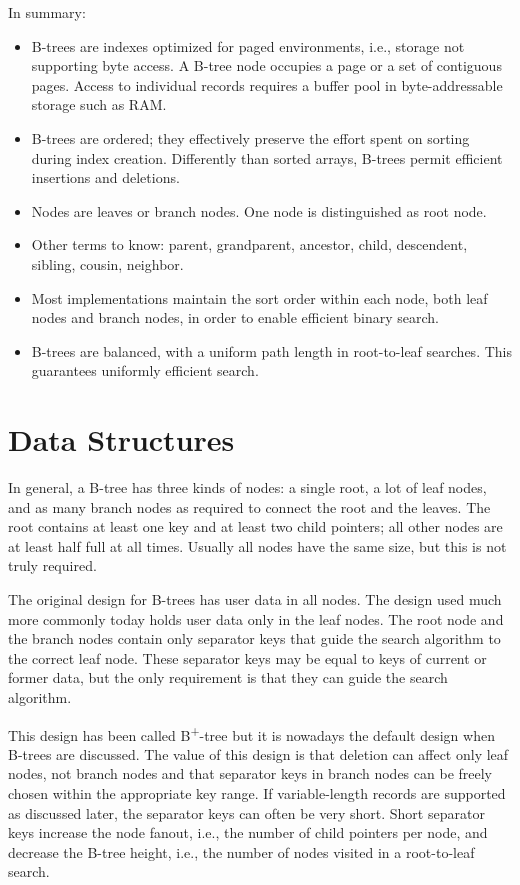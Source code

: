 In summary:

\begin{itemize}
\item
  B-trees are indexes optimized for paged environments, i.e., storage
  not supporting byte access. A B-tree node occupies a page or a set of
  contiguous pages. Access to individual records requires a buffer pool
  in byte-addressable storage such as RAM.
\item
  B-trees are ordered; they effectively preserve the effort spent on
  sorting during index creation. Differently than sorted arrays, B-trees
  permit efficient insertions and deletions.
\item
  Nodes are leaves or branch nodes. One node is distinguished as root
  node.
\item
  Other terms to know: parent, grandparent, ancestor, child, descendent,
  sibling, cousin, neighbor.
\item
  Most implementations maintain the sort order within each node, both
  leaf nodes and branch nodes, in order to enable efficient binary
  search.
\item
  B-trees are balanced, with a uniform path length in root-to-leaf
  searches. This guarantees uniformly efficient search.
\end{itemize}

\hypertarget{data-structures}{%
\section{Data Structures}\label{data-structures}}

In general, a B-tree has three kinds of nodes: a single root, a lot of
leaf nodes, and as many branch nodes as required to connect the root and
the leaves. The root contains at least one key and at least two child
pointers; all other nodes are at least half full at all times. Usually
all nodes have the same size, but this is not truly required.

The original design for B-trees has user data in all nodes. The design
used much more commonly today holds user data only in the leaf nodes.
The root node and the branch nodes contain only separator keys that
guide the search algorithm to the correct leaf node. These separator
keys may be equal to keys of current or former data, but the only
requirement is that they can guide the search algorithm.

This design has been called B\textsuperscript{+}-tree but it is nowadays
the default design when B-trees are discussed. The value of this design
is that deletion can affect only leaf nodes, not branch nodes and that
separator keys in branch nodes can be freely chosen within the
appropriate key range. If variable-length records are supported as
discussed later, the separator keys can often be very short. Short
separator keys increase the node fanout, i.e., the number of child
pointers per node, and decrease the B-tree height, i.e., the number of
nodes visited in a root-to-leaf search.


